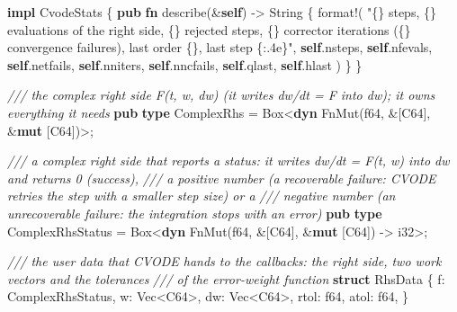 \documentclass[
  10pt,
]{article}
\newenvironment{Shaded}{}{}
\newcommand{\BuiltInTok}[1]{\textcolor[rgb]{0.00,0.50,0.00}{#1}}
\newcommand{\CommentTok}[1]{\textcolor[rgb]{0.38,0.63,0.69}{\textit{#1}}}
\newcommand{\DataTypeTok}[1]{\textcolor[rgb]{0.56,0.13,0.00}{#1}}
\newcommand{\KeywordTok}[1]{\textcolor[rgb]{0.00,0.44,0.13}{\textbf{#1}}}
\newcommand{\NormalTok}[1]{#1}
\newcommand{\OperatorTok}[1]{\textcolor[rgb]{0.40,0.40,0.40}{#1}}
\newcommand{\PreprocessorTok}[1]{\textcolor[rgb]{0.74,0.48,0.00}{#1}}
\newcommand{\StringTok}[1]{\textcolor[rgb]{0.25,0.44,0.63}{#1}}
\begin{document}
\begin{Shaded}
\begin{Highlighting}[]
\KeywordTok{impl}\NormalTok{ CvodeStats }\OperatorTok{\{}
    \KeywordTok{pub} \KeywordTok{fn}\NormalTok{ describe(}\OperatorTok{\&}\KeywordTok{self}\NormalTok{) }\OperatorTok{{-}\textgreater{}} \DataTypeTok{String} \OperatorTok{\{}
        \PreprocessorTok{format!}\NormalTok{(}
            \StringTok{"\{\} steps, \{\} evaluations of the right side, \{\} rejected steps, \{\} corrector iterations (\{\} convergence failures), last order \{\}, last step \{:.4e\}"}\OperatorTok{,}
            \KeywordTok{self}\OperatorTok{.}\NormalTok{nsteps}\OperatorTok{,} \KeywordTok{self}\OperatorTok{.}\NormalTok{nfevals}\OperatorTok{,} \KeywordTok{self}\OperatorTok{.}\NormalTok{netfails}\OperatorTok{,} \KeywordTok{self}\OperatorTok{.}\NormalTok{nniters}\OperatorTok{,} \KeywordTok{self}\OperatorTok{.}\NormalTok{nncfails}\OperatorTok{,} \KeywordTok{self}\OperatorTok{.}\NormalTok{qlast}\OperatorTok{,} \KeywordTok{self}\OperatorTok{.}\NormalTok{hlast}
\NormalTok{        )}
    \OperatorTok{\}}
\OperatorTok{\}}

\CommentTok{/// the complex right side F(t, w, dw) (it writes dw/dt = F into dw); it owns everything it needs}
\KeywordTok{pub} \KeywordTok{type}\NormalTok{ ComplexRhs }\OperatorTok{=} \DataTypeTok{Box}\OperatorTok{\textless{}}\KeywordTok{dyn} \BuiltInTok{FnMut}\NormalTok{(}\DataTypeTok{f64}\OperatorTok{,} \OperatorTok{\&}\NormalTok{[C64]}\OperatorTok{,} \OperatorTok{\&}\KeywordTok{mut}\NormalTok{ [C64])}\OperatorTok{\textgreater{};}

\CommentTok{/// a complex right side that reports a status: it writes dw/dt = F(t, w) into dw and returns 0 (success),}
\CommentTok{/// a positive number (a recoverable failure: CVODE retries the step with a smaller step size) or a}
\CommentTok{/// negative number (an unrecoverable failure: the integration stops with an error)}
\KeywordTok{pub} \KeywordTok{type}\NormalTok{ ComplexRhsStatus }\OperatorTok{=} \DataTypeTok{Box}\OperatorTok{\textless{}}\KeywordTok{dyn} \BuiltInTok{FnMut}\NormalTok{(}\DataTypeTok{f64}\OperatorTok{,} \OperatorTok{\&}\NormalTok{[C64]}\OperatorTok{,} \OperatorTok{\&}\KeywordTok{mut}\NormalTok{ [C64]) }\OperatorTok{{-}\textgreater{}} \DataTypeTok{i32}\OperatorTok{\textgreater{};}

\CommentTok{/// the user data that CVODE hands to the callbacks: the right side, two work vectors and the tolerances}
\CommentTok{/// of the error{-}weight function}
\KeywordTok{struct}\NormalTok{ RhsData }\OperatorTok{\{}
\NormalTok{    f}\OperatorTok{:}\NormalTok{ ComplexRhsStatus}\OperatorTok{,}
\NormalTok{    w}\OperatorTok{:} \DataTypeTok{Vec}\OperatorTok{\textless{}}\NormalTok{C64}\OperatorTok{\textgreater{},}
\NormalTok{    dw}\OperatorTok{:} \DataTypeTok{Vec}\OperatorTok{\textless{}}\NormalTok{C64}\OperatorTok{\textgreater{},}
\NormalTok{    rtol}\OperatorTok{:} \DataTypeTok{f64}\OperatorTok{,}
\NormalTok{    atol}\OperatorTok{:} \DataTypeTok{f64}\OperatorTok{,}
\OperatorTok{\}}


\end{Highlighting}
\end{Shaded}
\end{document}
